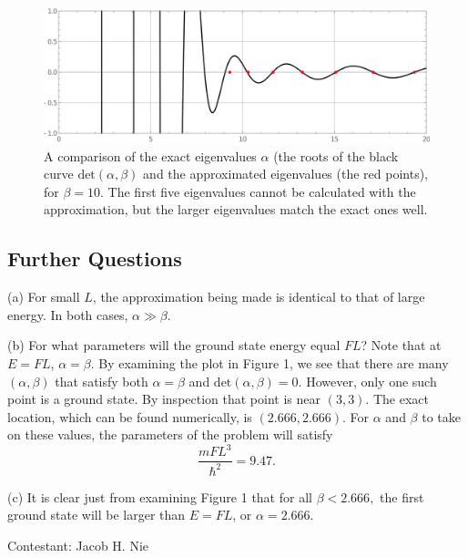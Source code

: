 \documentclass[12pt]{article}
\begin{document}
\begin{figure}[ht]
	\centering
	\includegraphics[width=\textwidth]{figures/plot4.png}
	\caption{A comparison of the exact eigenvalues $\alpha$ (the roots of the black curve $\text{det}(\alpha,\beta)$ and the approximated eigenvalues (the red points), for $\beta = 10$.  The first five eigenvalues cannot be calculated with the approximation, but the larger eigenvalues match the exact ones well.}
\end{figure}
\vspace{1cm}






\subsection*{Further Questions}
\noindent (a) For small $L$, the approximation being made is identical to that of large energy.  In both cases, $\alpha \gg \beta$.  

\vspace{1cm}
\noindent (b) For what parameters will the ground state energy equal $FL$?  Note that at $E = FL$, $\alpha = \beta$.  By examining the plot in Figure 1, we see that there are many $(\alpha, \beta)$ that satisfy both $\alpha = \beta$ and $\text{det}(\alpha, \beta) = 0$.  However, only one such point is a ground state.  By inspection that point is near $(3,3).$  The exact location, which can be found numerically, is $(2.666, 2.666)$.  For $\alpha$ and $\beta$ to take on these values, the parameters of the problem will satisfy
\[
	\frac{mFL^3}{\hbar^2} = 9.47.
\] 

\vspace{1cm}
\noindent (c) It is clear just from examining Figure 1 that for all $\beta < 2.666,$ the first ground state will be larger than $E = FL$, or $\alpha = 2.666$.  


\vspace{1cm}

\hfill Contestant: Jacob H. Nie


\medskip
\end{document}
